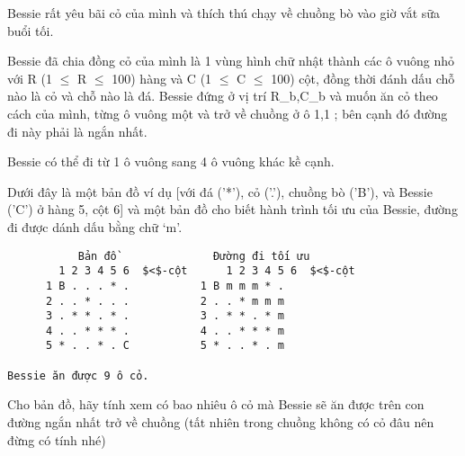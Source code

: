 Bessie rất yêu bãi cỏ của mình và thích thú chạy về chuồng bò vào  giờ vắt sữa buổi tối.  

   Bessie đã chia đồng cỏ của mình là 1 vùng hình chữ nhật thành  các ô vuông nhỏ với R (1  $\le$  R  $\le$  100) hàng và C (1  $\le$  C  $\le$  100) cột,  đồng thời đánh dấu chỗ nào là cỏ và chỗ nào là đá. Bessie đứng ở vị  trí R\_b,C\_b và muốn ăn cỏ theo cách của mình, từng ô vuông một và  trở về chuồng ở ô 1,1 ; bên cạnh đó đường đi này phải là ngắn nhất.  

   Bessie có thể đi từ 1 ô vuông sang 4 ô vuông khác kề cạnh.  

   Dưới đây là một bản đồ ví dụ [với đá ('*'), cỏ ('.'),  chuồng bò ('B'),  và Bessie ('C') ở hàng 5, cột 6] và một bản đồ cho biết hành trình  tối ưu của Bessie, đường đi được dánh dấu bằng chữ ‘m’.  
\begin{verbatim}
           Bản đồ               Đường đi tối ưu
        1 2 3 4 5 6  $<$-cột      1 2 3 4 5 6  $<$-cột
      1 B . . . * .           1 B m m m * .
      2 . . * . . .           2 . . * m m m
      3 . * * . * .           3 . * * . * m
      4 . . * * * .           4 . . * * * m
      5 * . . * . C           5 * . . * . m

Bessie ăn được 9 ô cỏ.
\end{verbatim}

   Cho bản đồ, hãy tính xem có bao nhiêu ô cỏ mà Bessie sẽ ăn được trên  con đường ngắn nhất trở về chuồng (tất nhiên trong chuồng không có  cỏ đâu nên đừng có tính nhé)